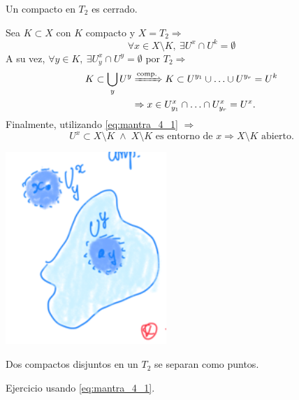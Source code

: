 \begin{prop}[Mantra 4]
Un compacto en $T_2$ es cerrado. 
\end{prop}
\begin{demo}
Sea $K \subset X$ con $K$ compacto y $X = T_2 \Rightarrow$
\begin{equation} \label{eq:mantra_4_1}
    \forall x \in X \setminus K,\ \exists U^x \cap U^k = \emptyset
\end{equation}
A su vez, $\forall y \in K,\ \exists U_y^x \cap U^y = \emptyset$ por $T_2 \Rightarrow$
\begin{align*}
    K \subset \bigcup_{y} U^y &\xRightarrow{\text{comp.}} K \subset U^{y_1} \cup \ldots \cup U^{y_r} = U^k\\
    &\Rightarrow x \in U_{y_1}^x \cap \ldots \cap U_{y_r}^x = U^x
.\end{align*}
Finalmente, utilizando \ref{eq:mantra_4_1} $\Rightarrow$
\[
    U^x \subset X \setminus K\; \land \;X\setminus K \text{ es entorno de } x \Rightarrow X \setminus K \text{ abierto.} 
\]
\begin{center}
    \includegraphics[scale=0.3]{images/mantra_4} 
\end{center}
\end{demo}
\begin{coro}
Dos compactos disjuntos en un $T_2$ se separan como puntos.
\end{coro}
\begin{demo}
    Ejercicio usando \ref{eq:mantra_4_1}.
\end{demo}


